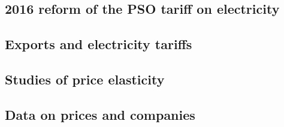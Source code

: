 \subsection{2016 reform of the PSO tariff on electricity}
\label{subsec:reform}



\subsection{Exports and electricity tariffs}
\label{subsec:tariffs}




\subsection{Studies of price elasticity}
\label{subsec:studies}




\subsection{Data on prices and companies}
\label{subsec:data}

